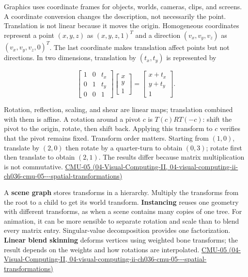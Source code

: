 Graphics uses coordinate frames for objects, worlds, cameras, clips, and screens. A coordinate conversion changes the description, not necessarily the point. Translation is not linear because it moves the origin. Homogeneous coordinates represent a point \((x,y,z)\) as \((x,y,z,1)^T\) and a direction \((v_x,v_y,v_z)\) as \((v_x,v_y,v_z,0)^T\). The last coordinate makes translation affect points but not directions. In two dimensions, translation by \((t_x,t_y)\) is represented by

\[
\begin{bmatrix}1&0&t_x\\0&1&t_y\\0&0&1\end{bmatrix}
\begin{bmatrix}x\\y\\1\end{bmatrix}
=\begin{bmatrix}x+t_x\\y+t_y\\1\end{bmatrix}.
\]

Rotation, reflection, scaling, and shear are linear maps; translation combined with them is affine. A rotation around a pivot \(c\) is \(T(c)RT(-c)\): shift the pivot to the origin, rotate, then shift back. Applying this transform to \(c\) verifies that the pivot remains fixed. Transform order matters. Starting from \((1,0)\), translate by \((2,0)\) then rotate by a quarter-turn to obtain \((0,3)\); rotate first then translate to obtain \((2,1)\). The results differ because matrix multiplication is not commutative. \href{../04-Visual-Computing-II/main.pdf\#nameddest=04-visual-computing-ii-ch036-cmu-05---spatial-transformations}{CMU-05 (04-Visual-Computing-II, 04-visual-computing-ii-ch036-cmu-05-\/-\/-spatial-transformations)}

A \textbf{scene graph} stores transforms in a hierarchy. Multiply the transforms from the root to a child to get its world transform. \textbf{Instancing} reuses one geometry with different transforms, as when a scene contains many copies of one tree. For animation, it can be more sensible to separate rotation and scale than to blend every matrix entry. Singular-value decomposition provides one factorization. \textbf{Linear blend skinning} deforms vertices using weighted bone transforms; the result depends on the weights and how rotations are interpolated. \href{../04-Visual-Computing-II/main.pdf\#nameddest=04-visual-computing-ii-ch036-cmu-05---spatial-transformations}{CMU-05 (04-Visual-Computing-II, 04-visual-computing-ii-ch036-cmu-05-\/-\/-spatial-transformations)}

